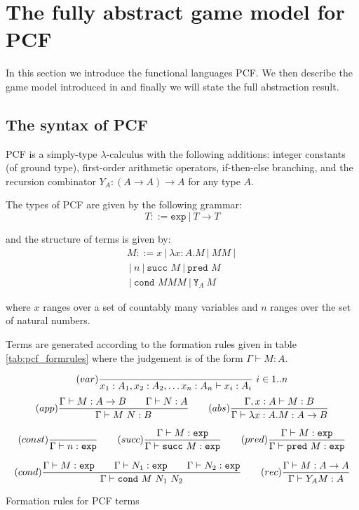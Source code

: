 \section{The fully abstract game model for PCF}

In this section we introduce the functional languages PCF. We then
describe the game model introduced in \cite{abramsky94full} and
finally we will state the full abstraction result.

\subsection{The syntax of PCF}
PCF is a simply-type $\lambda$-calculus with the following
additions: integer constants  (of ground type), first-order
arithmetic operators, if-then-else branching, and the recursion
combinator $Y_A : (A\rightarrow A)\rightarrow A$ for any type $A$.

The types of PCF are given by the following grammar:
$$ T ::= \texttt{exp}\ |\ T \rightarrow T$$

and the structure of terms is given by:
\begin{eqnarray*}
 M ::= x\ |\ \lambda x :A . M \ |\ M M \ |\ \\
\ |\ n \ |\ \texttt{succ } M \ |\  \texttt{pred } M \\
\ |\ \texttt{cond } M M M \ |\ \texttt{Y}_A\ M
\end{eqnarray*}

where $x$ ranges over a set of countably many variables and $n$
ranges over the set of natural numbers.

Terms are generated according to the formation rules given in table
\ref{tab:pcf_formrules} where the judgement is of the form $ \Gamma  \vdash M : A$.

\begin{table}[htbp]
$$ (var) \frac{\displaystyle }{x_1:A_1, x_2:A_2, \ldots x_n : A_n  \vdash x_i : A_i}\ i \in 1..n$$
$$ (app) \frac{\displaystyle \Gamma \vdash M : A\rightarrow B \qquad \Gamma \vdash N:A}{\Gamma \vdash M\ N : B}
\qquad (abs) \frac{\displaystyle \Gamma, x:A \vdash M : B}{\Gamma \vdash \lambda x :A . M : A\rightarrow B}$$

$$ (const) \frac{\displaystyle }{\Gamma \vdash n :\texttt{exp}}
\qquad (succ) \frac{\displaystyle \Gamma \vdash M:\texttt{exp} }{\Gamma \vdash \texttt{succ}\ M:\texttt{exp}}
\qquad (pred) \frac{\displaystyle \Gamma \vdash M:\texttt{exp} }{\Gamma \vdash \texttt{pred}\ M:\texttt{exp}}$$

$$
(cond) \frac{\displaystyle \Gamma \vdash M : \texttt{exp} \qquad \Gamma \vdash N_1 : \texttt{exp} \qquad \Gamma \vdash N_2 : \texttt{exp} }{\Gamma \vdash \texttt{cond}\ M\ N_1\ N_2}
\qquad  (rec) \frac{\displaystyle \Gamma \vdash M : A\rightarrow A }{ \Gamma \vdash Y_A M : A}$$

\caption{Formation rules for PCF terms}
\label{tab:pcf_formrules}
\end{table}

